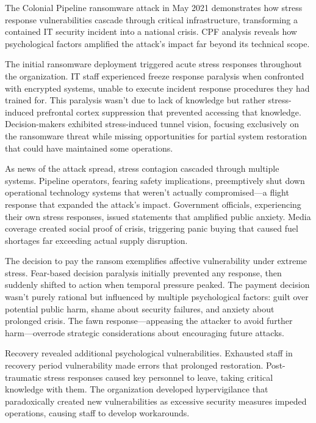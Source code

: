 \documentclass[manuscript,screen,review]{acmart}
\begin{document}
The Colonial Pipeline ransomware attack in May 2021 demonstrates how stress response vulnerabilities cascade through critical infrastructure, transforming a contained IT security incident into a national crisis. CPF analysis reveals how psychological factors amplified the attack's impact far beyond its technical scope.

The initial ransomware deployment triggered acute stress responses throughout the organization. IT staff experienced freeze response paralysis when confronted with encrypted systems, unable to execute incident response procedures they had trained for. This paralysis wasn't due to lack of knowledge but rather stress-induced prefrontal cortex suppression that prevented accessing that knowledge. Decision-makers exhibited stress-induced tunnel vision, focusing exclusively on the ransomware threat while missing opportunities for partial system restoration that could have maintained some operations.

As news of the attack spread, stress contagion cascaded through multiple systems. Pipeline operators, fearing safety implications, preemptively shut down operational technology systems that weren't actually compromised—a flight response that expanded the attack's impact. Government officials, experiencing their own stress responses, issued statements that amplified public anxiety. Media coverage created social proof of crisis, triggering panic buying that caused fuel shortages far exceeding actual supply disruption.

The decision to pay the ransom exemplifies affective vulnerability under extreme stress. Fear-based decision paralysis initially prevented any response, then suddenly shifted to action when temporal pressure peaked. The payment decision wasn't purely rational but influenced by multiple psychological factors: guilt over potential public harm, shame about security failures, and anxiety about prolonged crisis. The fawn response—appeasing the attacker to avoid further harm—overrode strategic considerations about encouraging future attacks.

Recovery revealed additional psychological vulnerabilities. Exhausted staff in recovery period vulnerability made errors that prolonged restoration. Post-traumatic stress responses caused key personnel to leave, taking critical knowledge with them. The organization developed hypervigilance that paradoxically created new vulnerabilities as excessive security measures impeded operations, causing staff to develop workarounds.
\end{document}
